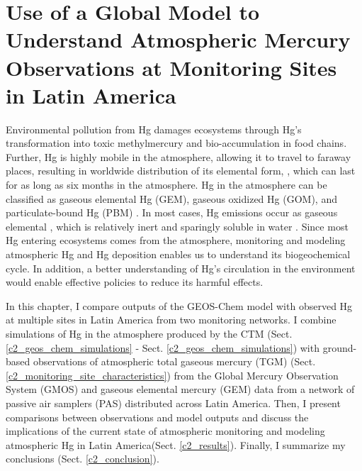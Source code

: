 \chapter{Use of a Global Model to Understand Atmospheric Mercury Observations at Monitoring Sites in Latin America }\label{chapter2}
\begin{flushleft}
Environmental pollution from Hg damages ecosystems through Hg's transformation into toxic methylmercury and bio-accumulation in food chains. Further, Hg is highly mobile in the atmosphere, allowing it to travel to faraway places, resulting in worldwide distribution of its elemental form, \hg, which can last for as long as six months in the atmosphere\cite{horowitz_new_2017,shah_improved_2021}. Hg in the atmosphere can be classified as gaseous elemental Hg (GEM), gaseous oxidized Hg (GOM), and particulate-bound Hg (PBM)  \cite{lindberg_synthesis_2007,schroeder_atmospheric_1998,landis_development_2002}. In most cases, Hg emissions occur as gaseous elemental \hg, which is relatively inert and sparingly soluble in water \cite{horowitz_new_2017}. Since most Hg entering ecosystems comes from the atmosphere, monitoring and modeling atmospheric Hg and Hg deposition enables us to understand its biogeochemical cycle. In addition, a better understanding of Hg's circulation in the environment would enable effective policies to reduce its harmful effects.
\end{flushleft}
\begin{flushleft}
 In this chapter, I compare outputs of the GEOS-Chem model with observed Hg at multiple sites in Latin America from two monitoring networks. I combine simulations of Hg in the atmosphere produced by the \gc CTM (Sect. \ref{c2_geos_chem_simulations} - Sect. \ref{c2_geos_chem_simulations}) with ground-based observations of atmospheric total gaseous mercury (TGM) (Sect. \ref{c2_monitoring_site_characteristics}) from the Global Mercury Observation System (GMOS)\cite{sprovieri_atmospheric_2016} and gaseous elemental mercury (GEM) data from a network of passive air samplers (PAS)\cite{quant_measuring_2021} distributed across Latin America. Then, I present comparisons between observations and model outputs and discuss the implications of the current state of atmospheric monitoring and modeling atmospheric Hg in Latin America(Sect. \ref{c2_results}). Finally, I summarize my conclusions (Sect. \ref{c2_conclusion}).
\end{flushleft}
